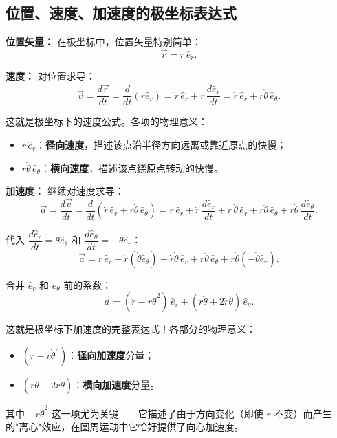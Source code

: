 \documentclass[12pt,a4paper]{article}
\begin{document}
\subsection{位置、速度、加速度的极坐标表达式}

\textbf{位置矢量：} 在极坐标中，位置矢量特别简单：
\[
\vec{r} = r\,\hat{e}_r.
\]

\textbf{速度：} 对位置求导：
\[
\vec{v} = \frac{d\vec{r}}{dt}
        = \frac{d}{dt}(r\hat{e}_r)
        = \dot{r}\,\hat{e}_r + r\,\frac{d\hat{e}_r}{dt}
        = \dot{r}\,\hat{e}_r + r\dot{\theta}\,\hat{e}_\theta.
\]

这就是极坐标下的速度公式。各项的物理意义：
\begin{itemize}
  \item $\dot{r}\,\hat{e}_r$：\textbf{径向速度}，描述该点沿半径方向远离或靠近原点的快慢；
  \item $r\dot{\theta}\,\hat{e}_\theta$：\textbf{横向速度}，描述该点绕原点转动的快慢。
\end{itemize}

\textbf{加速度：} 继续对速度求导：
\[
\vec{a} = \frac{d\vec{v}}{dt}
        = \frac{d}{dt}(\dot{r}\,\hat{e}_r + r\dot{\theta}\,\hat{e}_\theta)
        = \ddot{r}\,\hat{e}_r + \dot{r}\,\frac{d\hat{e}_r}{dt}
          + \dot{r}\,\dot{\theta}\,\hat{e}_r + r\ddot{\theta}\,\hat{e}_\theta
          + r\dot{\theta}\,\frac{d\hat{e}_\theta}{dt}.
\]

代入 $\dfrac{d\hat{e}_r}{dt} = \dot{\theta}\hat{e}_\theta$ 和 $\dfrac{d\hat{e}_\theta}{dt} = -\dot{\theta}\hat{e}_r$：
\[
\vec{a} = \ddot{r}\,\hat{e}_r + \dot{r}(\dot{\theta}\hat{e}_\theta)
        + \dot{r}\dot{\theta}\,\hat{e}_r + r\ddot{\theta}\,\hat{e}_\theta
        + r\dot{\theta}(-\dot{\theta}\hat{e}_r).
\]

合并 $\hat{e}_r$ 和 $\hat{e}_\theta$ 前的系数：
\[
\vec{a} = (\ddot{r} - r\dot{\theta}^2)\,\hat{e}_r
        + (r\ddot{\theta} + 2\dot{r}\dot{\theta})\,\hat{e}_\theta.
\]

这就是极坐标下加速度的完整表达式！各部分的物理意义：
\begin{itemize}
  \item $(\ddot{r} - r\dot{\theta}^2)$：\textbf{径向加速度}分量；
  \item $(r\ddot{\theta} + 2\dot{r}\dot{\theta})$：\textbf{横向加速度}分量。
\end{itemize}

其中 $-r\dot{\theta}^2$ 这一项尤为关键——它描述了由于方向变化（即使 $r$ 不变）而产生的"离心"效应，在圆周运动中它恰好提供了向心加速度。
\end{document}
